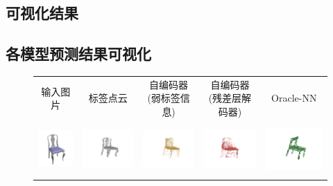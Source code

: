 \documentclass[bachelor, nocolorlinks, printoneside]{seuthesis} %
\begin{document}
\begin{Appendix}{}
    \chapter{可视化结果}
    \section{各模型预测结果可视化}
    \begin{figure}[!h]
        \centering
            \begin{tabular}{c@{}c@{}c@{}c@{}c@{}}
            输入图片 & 标签点云 & \makecell[c]{自编码器 \\(弱标签信息)} & \makecell[c]{自编码器 \\(残差层解码器)} & Oracle-NN\\
            \includegraphics[width=0.11\columnwidth,height=1.8cm]{figs/supp_real_dataset/Image/chair_fb8b45151900e6e016a0c57b9ceb6d01.png} &
            \includegraphics[width=0.18\columnwidth,height=2cm]{figs/supp_real_dataset/GT/chair_fb8b45151900e6e016a0c57b9ceb6d01_gt.png} &
            \includegraphics[width=0.18\columnwidth,height=2cm]{figs/supp_real_dataset/AE_label/chair_fb8b45151900e6e016a0c57b9ceb6d01_label.png} &
            \includegraphics[width=0.18\columnwidth,height=2cm]{figs/supp_real_dataset/AE/chair_fb8b45151900e6e016a0c57b9ceb6d01_pred.png} &
            \includegraphics[width=0.18\columnwidth,height=2cm]{figs/supp_real_dataset/oracle/chair_fb8b45151900e6e016a0c57b9ceb6d01_oracle.png} \\

\end{tabular}
\end{figure}
\end{Appendix}
\end{document}

